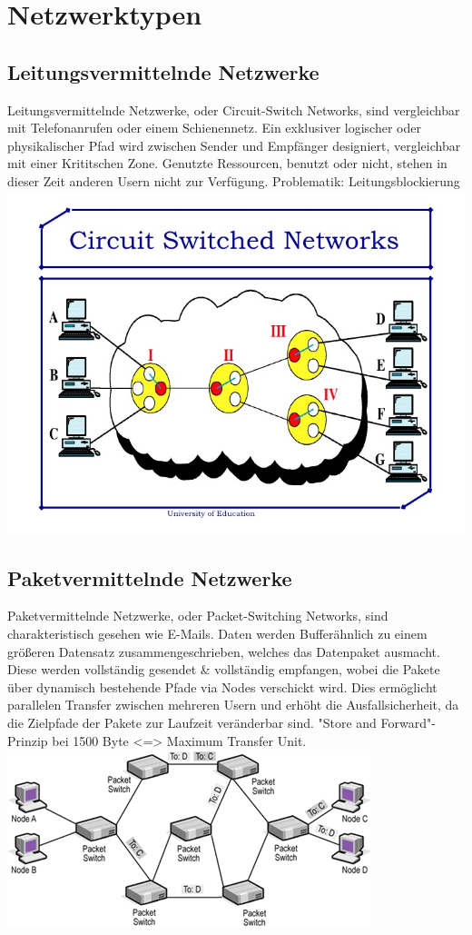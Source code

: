 \documentclass[11pt]{article}
\begin{document}
    \section{Netzwerktypen}
    \subsection{Leitungsvermittelnde Netzwerke}
    Leitungsvermittelnde Netzwerke, oder Circuit-Switch Networks, sind vergleichbar mit Telefonanrufen oder einem Schienennetz. Ein exklusiver logischer oder physikalischer
    Pfad wird zwischen Sender und Empfänger designiert, vergleichbar mit einer Krititschen Zone. Genutzte
    Ressourcen, benutzt oder nicht, stehen in dieser Zeit anderen Usern nicht zur Verfügung. Problematik: Leitungsblockierung\\

        \includegraphics[width=\textwidth]{Circuit_SwitchNetwork.jpg}

    \subsection{Paketvermittelnde Netzwerke}
    Paketvermittelnde Netzwerke, oder Packet-Switching Networks, sind charakteristisch gesehen wie E-Mails. Daten werden Bufferähnlich zu einem größeren Datensatz zusammengeschrieben,
    welches das Datenpaket ausmacht. Diese werden vollständig gesendet \& vollständig empfangen, wobei
    die Pakete über dynamisch bestehende Pfade via Nodes verschickt wird. Dies ermöglicht parallelen Transfer zwischen
    mehreren Usern und erhöht die Ausfallsicherheit, da die Zielpfade der Pakete zur Laufzeit veränderbar sind. "Store and Forward"-Prinzip bei 1500 Byte <=> Maximum Transfer Unit.\\

        \includegraphics[width=\textwidth]{PacketSwitching_Networks.png}
\end{document}
